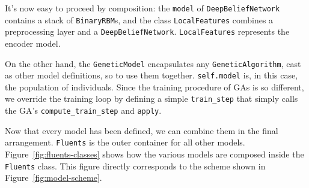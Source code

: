 It's now easy to proceed by composition: the \texttt{model} of
\texttt{DeepBeliefNetwork} contains a stack of \texttt{BinaryRBM}s, and the
class \texttt{LocalFeatures} combines a preprocessing layer and a
\texttt{DeepBeliefNetwork}. \texttt{LocalFeatures} represents the encoder
model.

On the other hand, the \texttt{GeneticModel} encapsulates any
\texttt{GeneticAlgorithm}, cast as other model definitions, so to use them
together. \verb|self.model| is, in this case, the population of individuals.
Since the training procedure of GAs is so different, we override the training
loop by defining a simple \verb|train_step| that simply calls
the GA's \verb|compute_train_step| and \verb|apply|.

Now that every model has been defined, we can combine them in the final
arrangement. \texttt{Fluents} is the outer container for all other models.
Figure~\ref{fig:fluents-classes} shows how the various models are composed
inside the \texttt{Fluents} class. This figure directly corresponds to the
scheme shown in Figure~\vref{fig:model-scheme}.
